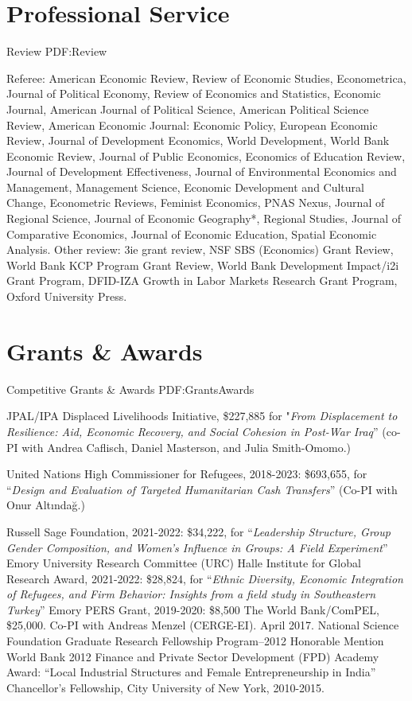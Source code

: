 \documentclass[letterpaper,10pt,oneside]{article}
\begin{document}
\begin{body}
\section
{Professional Service}
{Review}
{PDF:Review}
\par Referee: American Economic Review, Review of Economic Studies, Econometrica, Journal of Political Economy, Review of Economics and Statistics, Economic Journal, American Journal of Political Science, American Political Science Review, American Economic Journal: Economic Policy, European Economic Review, Journal of Development Economics, World Development, World Bank Economic Review, Journal of Public Economics, Economics of Education Review, Journal of Development Effectiveness, Journal of Environmental Economics and Management, Management Science, Economic Development and Cultural Change, Econometric Reviews, Feminist Economics, PNAS Nexus, Journal of Regional Science, Journal of Economic Geography*, Regional Studies, Journal of Comparative Economics, Journal of Economic Education, Spatial Economic Analysis. Other review: 3ie grant review, NSF SBS (Economics) Grant Review, World Bank KCP Program Grant Review, World Bank Development Impact/i2i Grant Program, DFID-IZA Growth in Labor Markets Research Grant Program, Oxford University Press.

\section
{Grants\newline
\& Awards}
{Competitive Grants \& Awards}
{PDF:GrantsAwards}
\par
\BulletItem
JPAL/IPA Displaced Livelihoods Initiative, \$227,885 for "\textit{From Displacement to Resilience: Aid, Economic Recovery, and Social Cohesion in Post-War Iraq}'' (co-PI with Andrea Caflisch, Daniel Masterson, and Julia Smith-Omomo.) 
 
\BulletItem
United Nations High Commissioner for Refugees, 2018-2023: \$693,655, for ``\textit{Design and Evaluation of Targeted Humanitarian Cash Transfers}'' (Co-PI with Onur Altındağ.)

\BulletItem
Russell Sage Foundation, 2021-2022: \$34,222, for ``\textit{Leadership Structure, Group Gender Composition, and Women’s Influence in Groups: A Field Experiment}''
\BulletItem
Emory University Research Committee (URC) Halle Institute for Global Research Award, 2021-2022: \$28,824, for ``\textit{Ethnic Diversity, Economic Integration of Refugees, and Firm Behavior: Insights from a field study in Southeastern Turkey}''
\BulletItem
Emory PERS Grant, 2019-2020: \$8,500
\BulletItem
The World Bank/ComPEL, \$25,000. Co-PI with Andreas Menzel (CERGE-EI). April 2017.
\BulletItem
National Science Foundation Graduate Research Fellowship Program--2012 Honorable Mention
\BulletItem
World Bank 2012 Finance and Private Sector Development (FPD) Academy Award: ``Local Industrial Structures and Female Entrepreneurship in India''
\BulletItem
Chancellor's Fellowship, City University of New York, 2010-2015.


\end{body}
\end{document}
